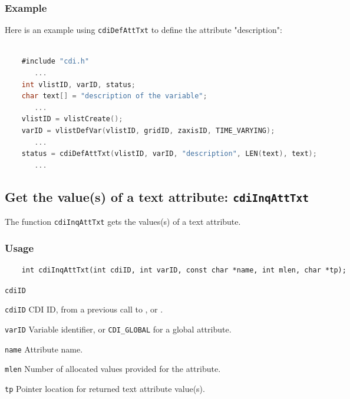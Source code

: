 \subsubsection*{Example}

Here is an example using {\texttt{cdiDefAttTxt}} to define the attribute "description":

\begin{lstlisting}[language=C, backgroundcolor=\color{pyellow}, basicstyle=\small, columns=flexible]

    #include "cdi.h"
       ...
    int vlistID, varID, status;
    char text[] = "description of the variable";
       ...
    vlistID = vlistCreate();
    varID = vlistDefVar(vlistID, gridID, zaxisID, TIME_VARYING);
       ...
    status = cdiDefAttTxt(vlistID, varID, "description", LEN(text), text);
       ...
\end{lstlisting}


\subsection{Get the value(s) of a text attribute: \texttt{cdiInqAttTxt}}
\label{cdiInqAttTxt}

The function {\texttt{cdiInqAttTxt}} gets the values(s) of a text attribute.

\subsubsection*{Usage}

\begin{verbatim}
    int cdiInqAttTxt(int cdiID, int varID, const char *name, int mlen, char *tp);
\end{verbatim}

\hspace*{4mm}\begin{minipage}[]{15cm}
\begin{deflist}{\texttt{cdiID}\ }
\item[\texttt{cdiID}]
CDI ID, from a previous call to {}, {} or {}.
\item[\texttt{varID}]
Variable identifier, or {\texttt{CDI\_GLOBAL}} for a global attribute.
\item[\texttt{name}]
Attribute name.
\item[\texttt{mlen}]
Number of allocated values provided for the attribute.
\item[\texttt{tp}]
Pointer location for returned text attribute value(s).

\end{deflist}
\end{minipage}


